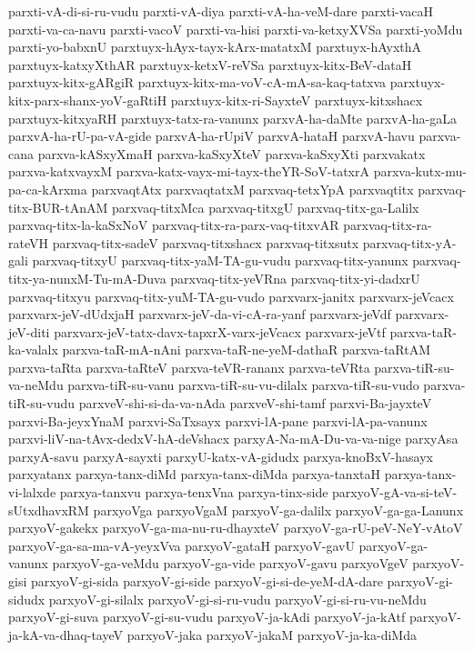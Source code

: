 {parxti-vA-di-si-ru-vudu
parxti-vA-diya
parxti-vA-ha-veM-dare
parxti-vacaH
parxti-va-ca-navu
parxti-vacoV
parxti-va-hisi
parxti-va-ketxyXVSa
parxti-yoMdu
parxti-yo-babxnU
parxtuyx-hAyx-tayx-kArx-matatxM
parxtuyx-hAyxthA
parxtuyx-katxyXthAR
parxtuyx-ketxV-reVSa
parxtuyx-kitx-BeV-dataH
parxtuyx-kitx-gARgiR
parxtuyx-kitx-ma-voV-cA-mA-sa-kaq-tatxva
parxtuyx-kitx-parx-shanx-yoV-gaRtiH
parxtuyx-kitx-ri-SayxteV
parxtuyx-kitxshacx
parxtuyx-kitxyaRH
parxtuyx-tatx-ra-vanunx
parxvA-ha-daMte
parxvA-ha-gaLa
parxvA-ha-rU-pa-vA-gide
parxvA-ha-rUpiV
parxvA-hataH
parxvA-havu
parxva-cana
parxva-kASxyXmaH
parxva-kaSxyXteV
parxva-kaSxyXti
parxvakatx
parxva-katxvayxM
parxva-katx-vayx-mi-tayx-theYR-SoV-tatxrA
parxva-kutx-mu-pa-ca-kArxma
parxvaqtAtx
parxvaqtatxM
parxvaq-tetxYpA
parxvaqtitx
parxvaq-titx-BUR-tAnAM
parxvaq-titxMca
parxvaq-titxgU
parxvaq-titx-ga-Lalilx
parxvaq-titx-la-kaSxNoV
parxvaq-titx-ra-parx-vaq-titxvAR
parxvaq-titx-ra-rateVH
parxvaq-titx-sadeV
parxvaq-titxshacx
parxvaq-titxsutx
parxvaq-titx-yA-gali
parxvaq-titxyU
parxvaq-titx-yaM-TA-gu-vudu
parxvaq-titx-yanunx
parxvaq-titx-ya-nunxM-Tu-mA-Duva
parxvaq-titx-yeVRna
parxvaq-titx-yi-dadxrU
parxvaq-titxyu
parxvaq-titx-yuM-TA-gu-vudo
parxvarx-janitx
parxvarx-jeVcacx
parxvarx-jeV-dUdxjaH
parxvarx-jeV-da-vi-cA-ra-yanf
parxvarx-jeVdf
parxvarx-jeV-diti
parxvarx-jeV-tatx-davx-tapxrX-varx-jeVcacx
parxvarx-jeVtf
parxva-taR-ka-valalx
parxva-taR-mA-nAni
parxva-taR-ne-yeM-dathaR
parxva-taRtAM
parxva-taRta
parxva-taRteV
parxva-teVR-rananx
parxva-teVRta
parxva-tiR-su-va-neMdu
parxva-tiR-su-vanu
parxva-tiR-su-vu-dilalx
parxva-tiR-su-vudo
parxva-tiR-su-vudu
parxveV-shi-si-da-va-nAda
parxveV-shi-tamf
parxvi-Ba-jayxteV
parxvi-Ba-jeyxYnaM
parxvi-SaTxsayx
parxvi-lA-pane
parxvi-lA-pa-vanunx
parxvi-liV-na-tAvx-dedxV-hA-deVshacx
parxyA-Na-mA-Du-va-va-nige
parxyAsa
parxyA-savu
parxyA-sayxti
parxyU-katx-vA-gidudx
parxya-knoBxV-hasayx
parxyatanx
parxya-tanx-diMd
parxya-tanx-diMda
parxya-tanxtaH
parxya-tanx-vi-lalxde
parxya-tanxvu
parxya-tenxVna
parxya-tinx-side
parxyoV-gA-va-si-teV-sUtxdhavxRM
parxyoVga
parxyoVgaM
parxyoV-ga-dalilx
parxyoV-ga-ga-Lanunx
parxyoV-gakekx
parxyoV-ga-ma-nu-ru-dhayxteV
parxyoV-ga-rU-peV-NeY-vAtoV
parxyoV-ga-sa-ma-vA-yeyxVva
parxyoV-gataH
parxyoV-gavU
parxyoV-ga-vanunx
parxyoV-ga-veMdu
parxyoV-ga-vide
parxyoV-gavu
parxyoVgeV
parxyoV-gisi
parxyoV-gi-sida
parxyoV-gi-side
parxyoV-gi-si-de-yeM-dA-dare
parxyoV-gi-sidudx
parxyoV-gi-silalx
parxyoV-gi-si-ru-vudu
parxyoV-gi-si-ru-vu-neMdu
parxyoV-gi-suva
parxyoV-gi-su-vudu
parxyoV-ja-kAdi
parxyoV-ja-kAtf
parxyoV-ja-kA-va-dhaq-tayeV
parxyoV-jaka
parxyoV-jakaM
parxyoV-ja-ka-diMda
}
